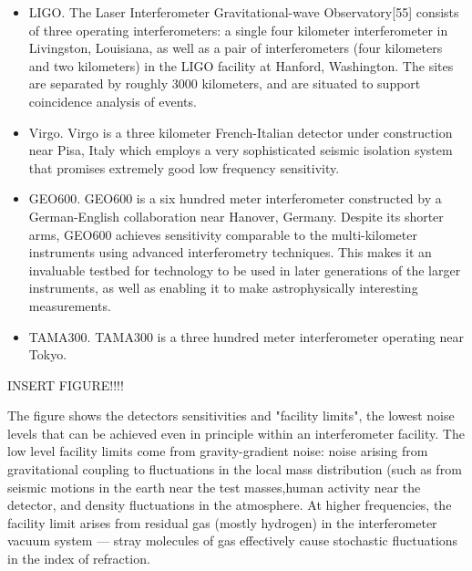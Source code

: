 \documentclass[binding=0.6cm, LaM]{sapthesis}
\begin{document}
\begin{itemize}
  \item LIGO. The Laser Interferometer Gravitational-wave Observatory[55] consists of three operating interferometers:
a single four kilometer interferometer in Livingston, Louisiana, as well as a pair of interferometers (four kilometers and two kilometers) in the LIGO facility at Hanford, Washington.
The sites are separated by roughly 3000 kilometers, and are situated to support coincidence analysis of events.
  \item Virgo. Virgo is a three kilometer French-Italian detector under construction near Pisa, Italy which employs a very sophisticated seismic isolation system that promises extremely good low
frequency sensitivity.
  \item GEO600. GEO600 is a six hundred meter interferometer constructed by a German-English collaboration near Hanover, Germany.
 Despite its shorter arms, GEO600 achieves sensitivity comparable to the multi-kilometer instruments using advanced interferometry techniques.
 This makes it an invaluable testbed for technology to be used in later generations of the larger instruments, as well as enabling it to make astrophysically interesting measurements.
  \item TAMA300. TAMA300 is a three hundred meter interferometer operating near Tokyo.

\end{itemize}


INSERT FIGURE!!!!

The figure shows the detectors sensitivities and "facility limits", the lowest noise levels that can be achieved even in principle within an interferometer facility.
The low level facility limits come from gravity-gradient noise: noise arising from gravitational coupling to fluctuations in the local mass distribution (such as from seismic motions in the earth near
 the test masses,human activity near the detector, and density fluctuations in the atmosphere. At higher frequencies, the facility limit arises from residual gas (mostly hydrogen) in the
interferometer vacuum system — stray molecules of gas effectively cause stochastic fluctuations in the index of refraction.
\end{document}
